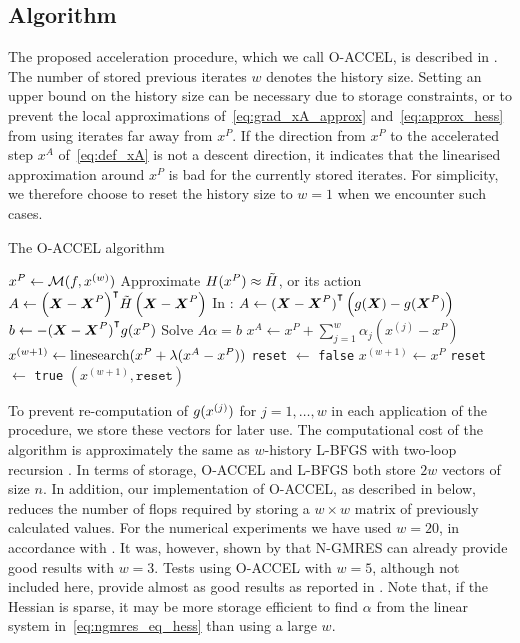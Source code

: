 \documentclass[main.tex]{subfiles}
\begin{document}
\subsection{Algorithm}
The proposed acceleration procedure, which we call O-ACCEL, is
described in .  The number of stored previous
iterates $w$ denotes the history size.  Setting an upper bound on the
history size can be necessary due to storage constraints, or to
prevent the local approximations of~\eqref{eq:grad_xA_approx}
and~\eqref{eq:approx_hess} from using iterates far away from $x^P$. If
the direction from $x^P$ to the accelerated step $x^A$
of~\eqref{eq:def_xA} is not a
descent direction, it indicates that the linearised approximation
around $x^P$ is bad for the currently stored iterates.  For
simplicity, we therefore choose to reset the history size to $w=1$
when we encounter such cases.
\begin{algorithm}[htb]
  \caption{The O-ACCEL algorithm}\label{alg:ngmreso}
  \begin{algorithmic}[1]
    \State $x^P\gets \mathcal{M}(f,x^{(w)})$
    \State Approximate $H(x^P)\approx \tilde{H}$, or
    its action
    \State $A\gets
    {\left(\boldsymbol{X}-\boldsymbol{X}^P\right)}^\intercal\tilde{H}
    \left(\boldsymbol{X}-\boldsymbol{X}^P\right)$
    \hfill {\footnotesize In : $A\gets{(\boldsymbol{X}-\boldsymbol{X}^P)}^\intercal\left(
        g(\boldsymbol{X})-g(\boldsymbol{X}^P)
      \right)$}
    \State $b\gets -{(\boldsymbol{X}-\boldsymbol{X}^P)}^\intercal{g(x^P)}$
    \State Solve  $A\alpha = b$
    \State $x^A \gets x^P + \sum_{j=1}^w\alpha_j(x^{(j)}-x^P)$
    \label{algline:descent_dir}
    \State $x^{(w+1)}\gets \textnormal{linesearch}(x^P+\lambda(x^A-x^P))$\label{algli:xp_xa_ls}
    \State \texttt{reset} $\gets$ \texttt{false}
    \Else
    \State $x^{(w+1)}\gets x^P$
    \State \texttt{reset} $\gets$ \texttt{true}
    \EndIf
    \State \Return $(x^{(w+1)},\texttt{reset})$
    \EndProcedure
  \end{algorithmic}
\end{algorithm}

To prevent re-computation of $g(x^{(j)})$ for $j=1,\dots,w$ in
each application of the procedure, we store these vectors for later
use.  The computational cost of the algorithm is approximately the
same as $w$-history L-BFGS with two-loop recursion
\citep{sterck2013steepest}. %
In terms of storage, O-ACCEL and L-BFGS both store $2w$ vectors of
size $n$. In addition, our implementation of O-ACCEL, as described in
 below, reduces the number of flops required by
storing a $w\times w$ matrix of previously calculated values. For the
numerical experiments we have used $w=20$, in accordance with
\citet{sterck2013steepest}.  It was, however, shown by
\citet{sterck2013steepest} that N-GMRES can already provide good
results with $w=3$.  Tests using O-ACCEL with $w=5$, although not
included here, provide almost as good results as reported in
.  Note that, if the Hessian is sparse, it
may be more storage efficient to find $\alpha$ from the linear system
in~\eqref{eq:ngmres_eq_hess} than using a large $w$.
\end{document}
